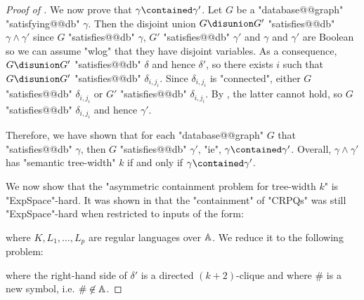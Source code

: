 \begin{proof}[Proof of ]
    We now prove that $\gamma \contained \gamma'$. Let $G$ be a
    "database@@graph" "satisfying@@db" $\gamma$. Then the disjoint union $G \disunion G'$ "satisfies@@db" $\gamma \land \gamma'$
    since $G$ "satisfies@@db" $\gamma$, $G'$ "satisfies@@db" $\gamma'$ and $\gamma$ and $\gamma'$
    are Boolean so we can assume "wlog" that they have disjoint variables.
    As a consequence, $G \disunion G'$ "satisfies@@db" $\delta$ and hence $\delta'$,
    so there exists $i$ such that $G \disunion G'$ "satisfies@@db" $\delta_{i,j_i}$.
    Since $\delta_{i,j_i}$ is "connected", either $G$ "satisfies@@db"
    $\delta_{i,j_i}$ or $G'$ "satisfies@@db" $\delta_{i,j_i}$.
    By , the latter cannot hold,
    so $G$ "satisfies@@db" $\delta_{i,j_i}$ and hence $\gamma'$.

    Therefore, we have shown that for each "database@@graph" $G$ that "satisfies@@db" 
    $\gamma$, then $G$ "satisfies@@db" $\gamma'$, "ie", $\gamma \contained \gamma'$. Overall,
    $\gamma \land \gamma'$ has "semantic tree-width" $k$ if and only if
    $\gamma \contained \gamma'$.

    \medskip

    We now show that the "asymmetric containment problem for tree-width $k$" is
    "ExpSpace"-hard.
    It was shown in \cite[Lemma 8]{Figueira2020Containment} that
    the "containment" of "CRPQs" was still "ExpSpace"-hard
    when restricted to inputs of the form:
    \begin{center}
    \end{center}
    where $K,L_1,\hdots,L_p$ are regular languages over $\mathbb{A}$.
    We reduce it to the following problem:
    \begin{center}
    \end{center}
    where the right-hand side of $\delta'$ is a directed $(k+2)$-clique
    and where $\#$ is a new symbol, i.e. $\# \not\in \mathbb{A}$.


\end{proof}
